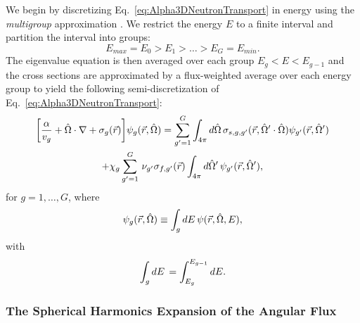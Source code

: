 We begin by discretizing Eq.~\ref{eq:Alpha3DNeutronTransport} in energy using the \textit{multigroup} approximation \cite{duderstadt_nuclear_1976}. We restrict the energy $E$ to a finite interval and partition the interval into groups:
\begin{equation*}
	E_{max} = E_{0} > E_{1} > \dots > E_{G} = E_{min}.
\end{equation*}
The eigenvalue equation is then averaged over each group $E_{g} < E < E_{g-1}$ and the cross sections are approximated by a flux-weighted average over each energy group to yield the following semi-discretization of Eq.~\ref{eq:Alpha3DNeutronTransport}:
\begin{multline}
	\bigg [ \frac{\alpha}{v_{g}} + \hat{\Omega} \cdot \nabla + \sigma_{g}(\vec{r}) \bigg ] \psi_{g}(\vec{r},\hat{\Omega}) = \sum_{g'=1}^{G} \int_{4\pi} \mathop{}\!d \hat{\Omega} \, \sigma_{s,g,g'}(\vec{r},\hat{\Omega}' \cdot \hat{\Omega}) \psi_{g'}(\vec{r},\hat{\Omega}') \\ + \chi_{g} \sum_{g'=1}^{G} \, \nu_{g'} \sigma_{f,g'}(\vec{r}) \int_{4\pi} \mathop{}\!d \hat{\Omega}' \, \psi_{g'}(\vec{r},\hat{\Omega}'), 
	\label{eq:Alpha3DMG}
\end{multline}
for $g = 1, \dots, G$, where
\begin{equation}
	\psi_{g}(\vec{r},\hat{\Omega}) \equiv \int_{g} \mathop{}\!d E \, \psi(\vec{r},\hat{\Omega},E),
\end{equation}
with
\begin{equation}
	\int_{g} \mathop{}\!d E \, = \int_{E_{g}}^{E_{g-1}} \mathop{}\!d E.
\end{equation}

\subsubsection{The Spherical Harmonics Expansion of the Angular Flux}

